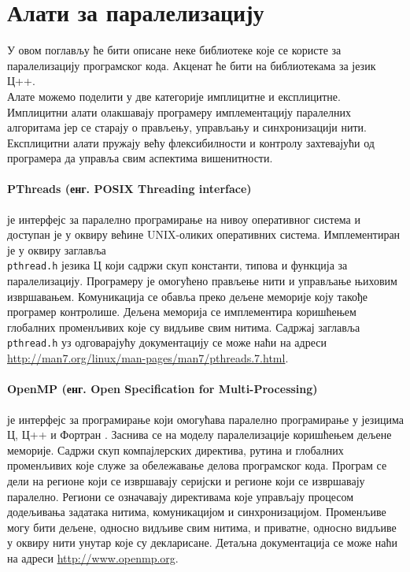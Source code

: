 \documentclass[12pt,oneside]{memoir}
\begin{document}
  \section{Алати за паралелизацију}
	У овом поглављу ће бити описане неке библиотеке које се користе за паралелизацију програмског кода. Акценат ће бити на библиотекама за језик Ц++. 
	\\ \indent Алате можемо поделити у две категорије имплицитне и експлицитне. Имплицитни алати олакшавају програмеру имплементацију паралелних алгоритама јер се старају о прављењу, управљању и синхронизацији нити. Експлицитни алати пружају већу флексибилности и контролу захтевајући од програмера да управља свим аспектима вишенитности.
	
\paragraph{ PThreads (енг. POSIX Threading interface)} је интерфејс за паралелно програмирање на нивоу оперативног система и доступан је у оквиру већине UNIX-оликих оперативних система. Имплементиран је у оквиру заглавља \\ \texttt{pthread.h} језика Ц који садржи скуп константи, типова и функција за паралелизацију. Програмеру је омогућено прављење нити и управљање њиховим извршавањем. Комуникација се обавља преко дељене меморије коју такође програмер контролише. Дељена меморија се имплементира коришћењем глобалних променљивих које су видљиве свим нитима. Садржај заглавља \texttt{pthread.h} уз одговарајућу документацију се може наћи на адреси \url{http://man7.org/linux/man-pages/man7/pthreads.7.html}.

\paragraph{OpenMP (енг. Open Specification for Multi-Processing)} је интерфејс за програмирање који омогућава паралелно програмирање у језицима Ц, Ц++ и Фортран . Заснива се на моделу паралелизације коришћењем дељене меморије. Садржи скуп компајлерских директива, рутина и глобалних променљивих које служе за обележавање делова програмског кода. Програм се дели на регионе који се извршавају серијски и регионе који се извршавају паралелно. Региони се означавају директивама које управљају процесом додељивања задатака нитима, комуникацијом и синхронизацијом. Променљиве могу бити дељене, односно видљиве свим нитима, и приватне, односно видљиве у оквиру нити унутар које су декларисане. Детаљна документација се може наћи на адреси \url{http://www.openmp.org}. 
\end{document}
